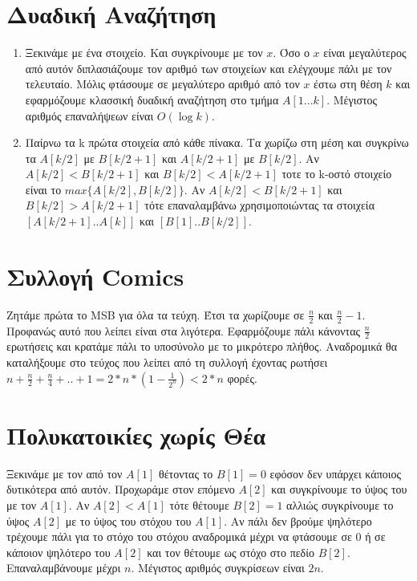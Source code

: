 \documentclass[a4paper,10pt]{article} \usepackage{anysize}
\begin{document}
\section{Δυαδική Αναζήτηση}
\begin{enumerate}
\item Ξεκινάμε με ένα στοιχείο. Και συγκρίνουμε με τον $x$. Όσο ο $x$ είναι
μεγαλύτερος από αυτόν διπλασιάζουμε τον αριθμό των στοιχείων και ελέγχουμε
πάλι με τον τελευταίο. Μόλις φτάσουμε σε μεγαλύτερο αριθμό από τον $x$ έστω
στη θέση $k$ και εφαρμόζουμε κλασσική δυαδική αναζήτηση στο τμήμα $A[1...k]$. 
Μέγιστος αριθμός επαναλήψεων είναι $O(\log{k})$.
\item Παίρνω τα k πρώτα στοιχεία από κάθε πίνακα. Τα χωρίζω στη μέση και
συγκρίνω τα $A[k/2]$ με $B[k/2+1]$ και $A[k/2+1]$ με $B[k/2]$. Αν
$A[k/2]<B[k/2+1]$ και $B[k/2]<A[k/2+1]$ τοτε το k-οστό στοιχείο είναι το
$max\{A[k/2],B[k/2]\}$. Αν $A[k/2]<B[k/2+1]$ και $B[k/2]>A[k/2+1]$ τότε
επαναλαμβάνω χρησιμοποιώντας τα στοιχεία $[A[k/2+1]..A[k]]$ και
$[B[1]..B[k/2]]$.
\end{enumerate}
\section{Συλλογή Comics}
Ζητάμε πρώτα το MSB για όλα τα τεύχη. Έτσι τα χωρίζουμε σε $\frac{n}{2}$ και
$\frac{n}{2}-1$. Προφανώς αυτό που λείπει είναι στα λιγότερα. Εφαρμόζουμε πάλι
κάνοντας $\frac{n}{2}$ ερωτήσεις και κρατάμε πάλι το υποσύνολο με το μικρότερο
πλήθος. Αναδρομικά θα καταλήξουμε στο τεύχος που λείπει από τη συλλογή έχοντας
ρωτήσει $n+\frac{n}{2}+\frac{n}{4}+..+1=2*n*(1-\frac{1}{2^n}) < 2*n$ φορές.
\section{Πολυκατοικίες χωρίς Θέα}
Ξεκινάμε με τον από τον $A[1]$ θέτοντας το $B[1]=0$ εφόσον δεν υπάρχει κάποιος
δυτικότερα από αυτόν. Προχωράμε στον επόμενο $A[2]$ και συγκρίνουμε το ύψος
του με τον $A[1]$. Αν $A[2]<A[1]$ τότε θέτουμε $B[2]=1$ αλλιώς συγκρίνουμε το
ύψος $A[2]$ με το ύψος του στόχου του $A[1]$. Αν πάλι δεν βρούμε ψηλότερο
τρέχουμε πάλι για το στόχο του στόχου αναδρομικά μέχρι να φτάσουμε σε 0
ή σε κάποιον ψηλότερο του $A[2]$ και τον θέτουμε ως στόχο στο πεδίο $B[2]$.
Επαναλαμβάνουμε μέχρι $n$. Μέγιστος αριθμός συγκρίσεων είναι $2n$.
\end{document}
